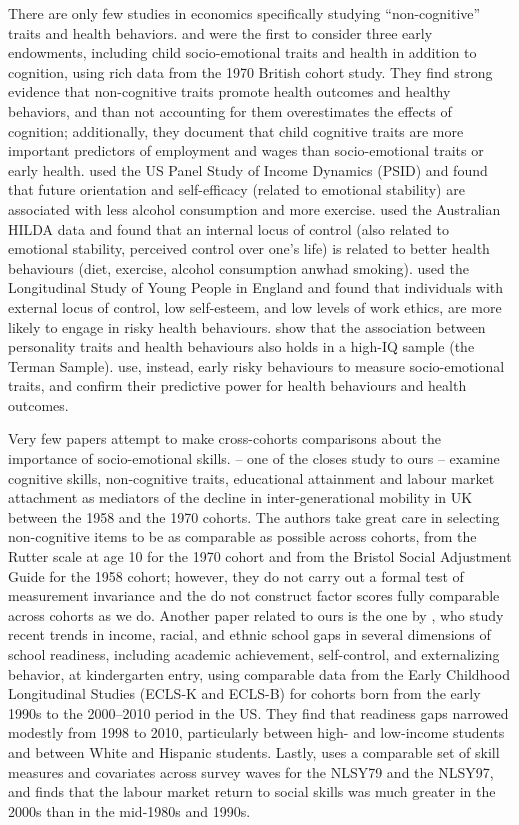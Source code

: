 There are only few studies in economics specifically studying ``non-cognitive'' traits and health behaviors. \citet{Conti2010a} and \citet{Conti2011} were the first to consider three early endowments, including child socio-emotional traits and health in addition to cognition, using rich data from the 1970 British cohort study. They find strong evidence that non-cognitive traits promote health outcomes and healthy behaviors, and than not accounting for them overestimates the effects of cognition; additionally, they document that child cognitive traits are more important predictors of employment and wages than socio-emotional traits or early health. \citet{Chiteji2010} used the US Panel Study of Income Dynamics (PSID) and found that future orientation and self-efficacy (related to emotional stability) are associated with less alcohol consumption and more exercise. \citet{Cobb-Clark2014} used the Australian HILDA data and found that an internal locus of control (also related to emotional stability, perceived control over one's life) is related to better health behaviours (diet, exercise, alcohol consumption anwhad smoking). \citet{Mendolia2014a} used the Longitudinal Study of Young People in England and found that individuals with external locus of control, low self-esteem, and low levels of work ethics, are more likely to engage in risky health behaviours. \citet{Savelyev2017} show that the association between personality traits and health behaviours also holds in a high-IQ sample (the Terman Sample). \citet{Heckman2016a} use, instead, early risky behaviours to measure socio-emotional traits, and confirm their predictive power for health behaviours and health outcomes.

Very few papers attempt to make cross-cohorts comparisons about the importance of socio-emotional skills. \citet{Blanden2007} -- one of the closes study to ours -- examine cognitive skills, non‐cognitive traits, educational attainment and labour market attachment as mediators of the decline in inter-generational mobility in UK between the 1958 and the 1970 cohorts. The authors take great care in selecting non-cognitive items to be as comparable as possible across cohorts, from the Rutter scale at age 10 for the 1970 cohort and from the Bristol Social Adjustment Guide for the 1958 cohort; however, they do not carry out a formal test of measurement invariance and the do not construct factor scores fully comparable across cohorts as we do. Another paper related to ours is the one by \citet{Reardon2016}, who study recent trends in income, racial, and ethnic school gaps in several dimensions of school readiness, including academic achievement, self-control, and externalizing behavior, at
kindergarten entry, using comparable data from the Early Childhood Longitudinal Studies (ECLS-K and ECLS-B) for cohorts born from the
early 1990s to the 2000–2010 period in the US. They find that readiness gaps narrowed modestly from 1998 to 2010, particularly between high- and low-income students and between White and Hispanic students. Lastly, \citet{Deming2017} uses a comparable set of skill measures and covariates across survey waves for the NLSY79 and the NLSY97, and finds that the labour market return to social skills was much greater in the 2000s than in the mid-1980s and 1990s.

